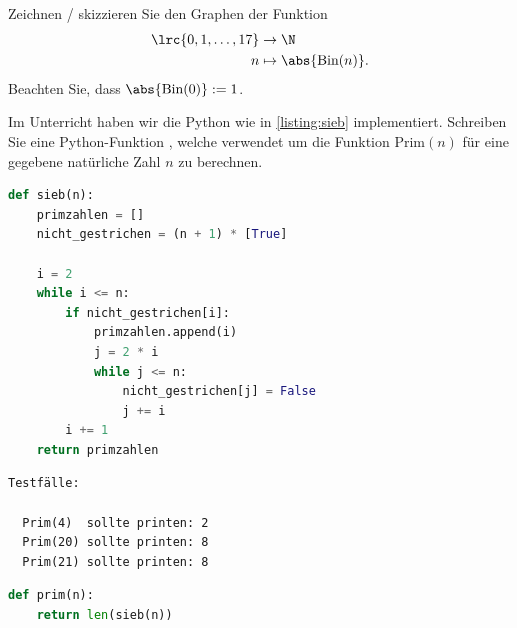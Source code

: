 \begin{questions}
\question[2]
Zeichnen / skizzieren Sie den Graphen der Funktion
\begin{align*}
  \lrc{0, 1, \ldots, 17} &\to\N\\
  n &\mapsto\abs{\text{Bin}(n)}.
\end{align*}
Beachten Sie, dass $\abs{\text{Bin}(0)} := 1$.

\begin{solution}
\begin{figure}[H]
\end{figure}
\end{solution}


\question[2] Im Unterricht haben wir die Python  wie in \cref{listing:sieb} implementiert. 
Schreiben Sie eine Python-Funktion , welche  verwendet um die Funktion $\text{Prim}(n)$ für eine gegebene natürliche Zahl $n$ zu berechnen.

\begin{lstlisting}[language=Python,caption=Sieb des Eratosthenes,numbers=none,label=listing:sieb]
def sieb(n):
    primzahlen = []
    nicht_gestrichen = (n + 1) * [True]

    i = 2
    while i <= n:
        if nicht_gestrichen[i]:
            primzahlen.append(i)
            j = 2 * i
            while j <= n:
                nicht_gestrichen[j] = False
                j += i
        i += 1
    return primzahlen
\end{lstlisting}

\begin{lstlisting}[numbers=none]
  Testfälle:

  Prim(4)  sollte printen: 2
  Prim(20) sollte printen: 8
  Prim(21) sollte printen: 8
\end{lstlisting}
\begin{solution}
\begin{lstlisting}[language=Python,caption=Prim,numbers=none]
def prim(n):
    return len(sieb(n))
\end{lstlisting}
\end{solution}


\end{questions}
